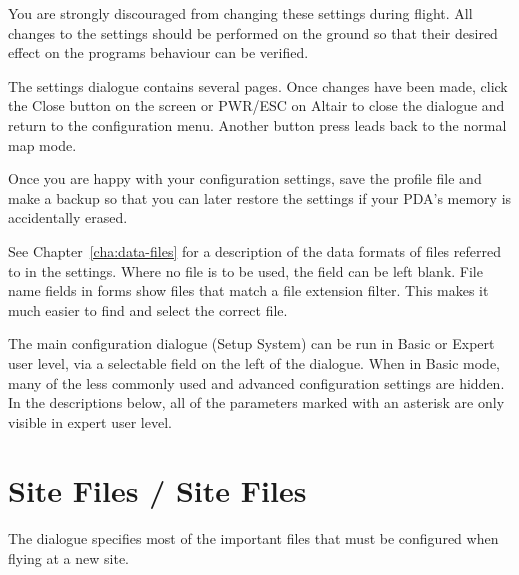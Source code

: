 You are strongly discouraged from changing these settings during
flight.  \warning  All changes to the settings should be performed on the ground
so that their desired effect on the programs behaviour can be
verified.

The settings dialogue contains several pages.  Once changes have been made,
click the Close button on the screen or PWR/ESC on Altair to close the dialogue
and return to the configuration menu. Another button press leads back to 
the normal map mode.

\tip Once you are happy with your configuration settings, save the
profile file and make a backup so that you can later restore the
settings if your PDA's memory is accidentally erased.

See Chapter~\ref{cha:data-files} for a description of the data formats
of files referred to in the settings.  Where no file is to be used,
the field can be left blank.  File name fields in forms show files
that match a file extension filter.  This makes it much easier to find
and select the correct file.

The main configuration dialogue (Setup System) can be run in Basic or
Expert user level, via a selectable field on the left of the dialogue.
When in Basic mode, many of the less commonly used and advanced
configuration settings are hidden.  In the descriptions below,
all of the parameters marked with an asterisk are only visible in
expert user level. 

\section{Site Files / Site Files}
The dialogue specifies most of the important files that must be
configured when flying at a new site.

